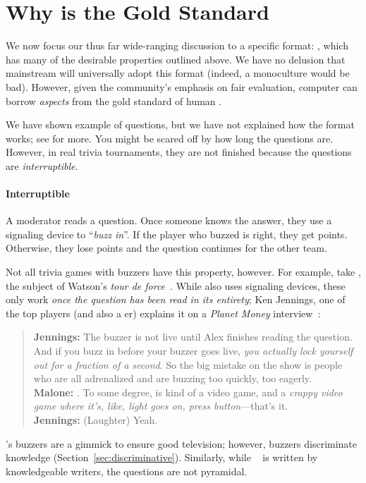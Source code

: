 

\section{Why \qb{} is the Gold Standard}
\label{sec:qb}

We now focus our thus far wide-ranging  discussion to a specific format: \qb{}, which has many of the desirable properties outlined above.
We have no delusion that mainstream  will universally adopt this format (indeed, a monoculture would be bad).
However, given the community's emphasis on fair evaluation, computer  can borrow \emph{aspects} from the gold standard of human .

We have shown example of \qb{} questions, but we have not explained how the format works; see  for more.
You might be scared off by how long the questions are.
However, in real \qb{} trivia tournaments, they are not finished because the questions are \emph{interruptible}.

\paragraph{Interruptible}

A moderator reads a question.
Once someone knows the answer, they use a signaling device to ``\emph{buzz in}''.
If the player who buzzed is right, they get points.
Otherwise, they lose points and the question continues for the other team.  

Not all trivia games with buzzers have this property, however.
For example, take \jeopardy{}, the subject of Watson's \textit{tour de force}~\cite{ferruci-10}.  
While \jeopardy{} also uses signaling devices, these only work \emph{once the question has been read in its entirety}; Ken Jennings, one of the top \jeopardy{} players (and also a \qb{}er) explains it on a \textit{Planet Money} interview~\cite{malone-19}: \clearpage
\begin{quote}
{\bf Jennings:} The buzzer is
    not live until Alex finishes reading the question. And if you buzz
    in before your buzzer goes live, \emph{you actually lock yourself out
    for a fraction of a second}. So the big mistake on the show is
    people who are all adrenalized and are buzzing too quickly, too
    eagerly. \\
{\bf Malone:} . To some degree, \jeopardy{} is kind of a video game, and a \emph{crappy video game where it's, like, light goes on, press button}---that's it. \\
{\bf Jennings:} (Laughter) Yeah. \\
\end{quote}
\jeopardy{}'s buzzers are a gimmick to ensure good television; however, \qb{} buzzers discriminate knowledge (Section~\ref{sec:discriminative}).
Similarly, while \triviaqa{}~\cite{joshi-17} is written by knowledgeable writers, the questions are not pyramidal.

